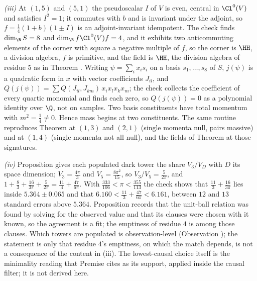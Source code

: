 \emph{(iii)} At $(1,5)$ and $(5,1)$ the pseudoscalar $I$ of $V$ is even, central in $\Cl^{0}(V)$ and satisfies $I^{2} = 1$; it commutes with $b$ and is invariant under the adjoint, so $f = \tfrac14(1+b)(1 \pm I)$ is an adjoint-invariant idempotent. The check finds $\dim_{\R} S = 8$ and $\dim_{\R} f\Cl^{0}(V)f = 4$, and it exhibits two anticommuting elements of the corner with square a negative multiple of $f$, so the corner is $\HH$, a division algebra, $f$ is primitive, and the field is $\HH$, the division algebra of residue $5$ as in Theorem . Writing $\psi = \sum_{i} x_{i}s_{i}$ on a basis $s_{1}, \ldots, s_{8}$ of $S$, $j(\psi)$ is a quadratic form in $x$ with vector coefficients $J_{il}$, and $Q(j(\psi)) = \sum Q(J_{il}, J_{km})\,x_{i}x_{l}x_{k}x_{m}$; the check collects the coefficient of every quartic monomial and finds each zero, so $Q(j(\psi)) = 0$ as a polynomial identity over $\Q$, not on samples. Two basis constituents have total momentum with $m^{2} = \tfrac14 \neq 0$. Hence mass begins at two constituents. The same routine reproduces Theorem  at $(1,3)$ and $(2,1)$ (single momenta null, pairs massive) and at $(1,4)$ (single momenta not all null), and the fields of Theorem  at those signatures.

\emph{(iv)} Proposition  gives each populated dark tower the share $V_{3}/V_{D}$ with $D$ its space dimension; $V_{3} = \tfrac{4\pi}{3}$ and $V_{5} = \tfrac{8\pi^{2}}{15}$, so $V_{3}/V_{5} = \tfrac{5}{2\pi}$, and $1 + \tfrac83 + \tfrac{16}{3\pi} + \tfrac{5}{2\pi} = \tfrac{11}{3} + \tfrac{47}{6\pi}$. With $\tfrac{333}{106} < \pi < \tfrac{355}{113}$ the check shows that $\tfrac{11}{3} + \tfrac{16}{3\pi}$ lies inside $5.364 \pm 0.065$ and that $6.160 < \tfrac{11}{3} + \tfrac{47}{6\pi} < 6.161$, between $12$ and $13$ standard errors above $5.364$. Proposition  records that the unit-ball relation was found by solving for the observed value and that its clauses were chosen with it known, so the agreement is a fit; the emptiness of residue $4$ is among those clauses. Which towers are populated is observation-level (Observation ); the statement is only that residue $4$'s emptiness, on which the match depends, is not a consequence of the content in (iii). The lowest-causal choice itself is the minimality reading that Premise  cites as its support, applied inside the causal filter; it is not derived here.
